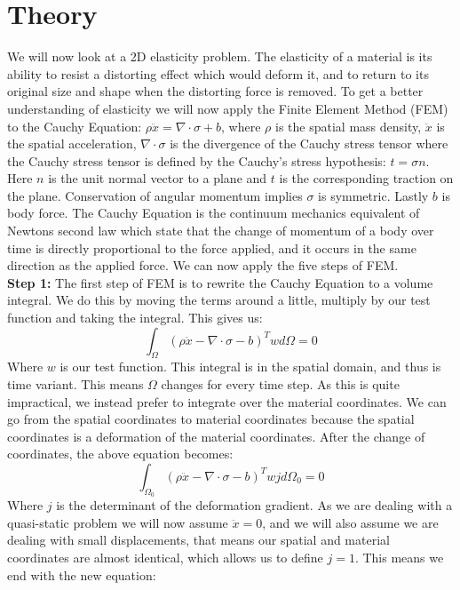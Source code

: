 \section{Theory}
We will now look at a 2D elasticity problem. The elasticity of a material is its ability to resist a distorting effect which would deform it, and to return to its original size and shape when the distorting force is removed. To get a better understanding of elasticity we will now apply the Finite Element Method (FEM) to the Cauchy Equation: $\rho \ddot x = \nabla \cdot \sigma + b$, where $\rho$ is the spatial mass density, $\ddot x$ is the spatial acceleration, $\nabla \cdot \sigma$ is the divergence of the Cauchy stress tensor where the Cauchy stress tensor is defined by the Cauchy's stress hypothesis: $t = \sigma n$. Here $n$ is the unit normal vector to a plane and $t$ is the corresponding traction on the plane. Conservation of angular momentum implies $\sigma$ is symmetric. Lastly $b$ is body force. The Cauchy Equation is the continuum mechanics equivalent of Newtons second law which state that the change of momentum of a body over time is directly proportional to the force applied, and it occurs in the same direction as the applied force. We can now apply the five steps of FEM.\\
\textbf{Step 1:} The first step of FEM is to rewrite the Cauchy Equation to a volume integral. We do this by moving the terms around a little, multiply by our test function and taking the integral. This gives us:
\begin{equation*}
	\int_\Omega (\rho \ddot x - \nabla \cdot \sigma - b)^T w d\Omega = 0
\end{equation*}
Where $w$ is our test function. This integral is in the spatial domain, and thus is time variant. This means $\Omega$ changes for every time step. As this is quite impractical, we instead prefer to integrate over the material coordinates. We can go from the spatial coordinates to material coordinates because the spatial coordinates is a deformation of the material coordinates. After the change of coordinates, the above equation becomes:
\begin{equation*}
	\int_{\Omega_0} (\rho \ddot x - \nabla \cdot \sigma - b)^T w j d\Omega_0 = 0
\end{equation*}
Where $j$ is the determinant of the deformation gradient. As we are dealing with a quasi-static problem we will now assume $\ddot x = 0$, and we will also assume we are dealing with small displacements, that means our spatial and material coordinates are almost identical, which allows us to define $j = 1$. This means we end with the new equation:
